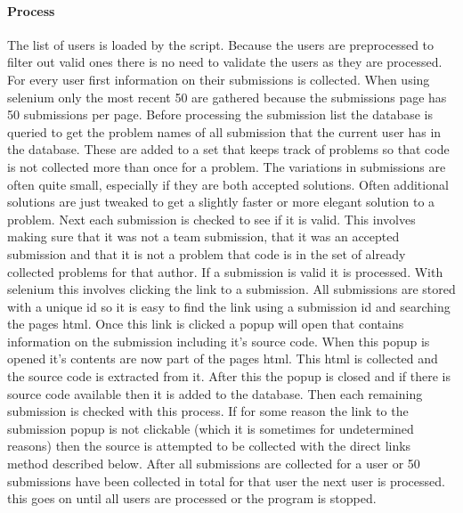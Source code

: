 \documentclass{article}
\begin{document}
\paragraph{Process}
The list of users is loaded by the script. Because the users are preprocessed to filter out valid ones there is no need to validate the users as they are processed. For every user first information on their submissions is collected. When using selenium only the most recent 50 are gathered because the submissions page has 50 submissions per page. Before processing the submission list the database is queried to get the problem names of all submission that the current user has in the database. These are added to a set that keeps track of problems so that code is not collected more than once for a problem. The variations in submissions are often quite small, especially if they are both accepted solutions. Often additional solutions are just tweaked to get a slightly faster or more elegant solution to a problem. Next each submission is checked to see if it is valid. This involves making sure that it was not a team submission, that it was an accepted submission and that it is not a problem that code is in the set of already collected problems for that author. If a submission is valid it is processed. With selenium this involves clicking the link to a submission. All submissions are stored with a unique id so it is easy to find the link using a submission id and searching the pages html. Once this link is clicked a popup will open that contains information on the submission including it's source code. When this popup is opened it's contents are now part of the pages html. This html is collected and the source code is extracted from it. After this the popup is closed and if there is source code available then it is added to the database. Then each remaining submission is checked with this process. If for some reason the link to the submission popup is not clickable (which it is sometimes for undetermined reasons) then the source is attempted to be collected with the direct links method described below. After all submissions are collected for a user or 50 submissions have been collected in total for that user the next user is processed. this goes on until all users are processed or the program is stopped.
\end{document}
